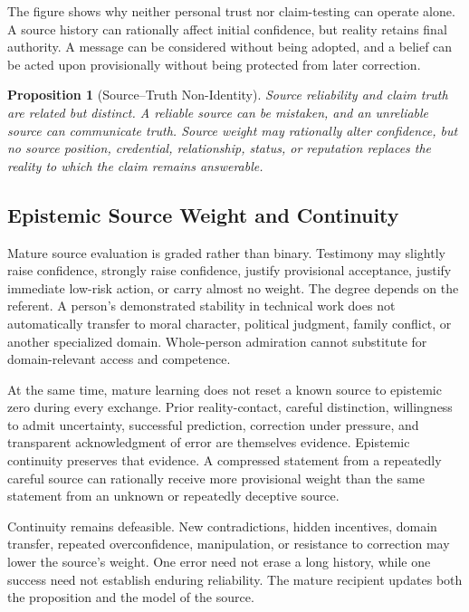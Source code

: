 \documentclass[11pt]{article}
\newtheorem{proposition}{Proposition}
\begin{document}
The figure shows why neither personal trust nor claim-testing can operate alone. A source history can rationally affect initial confidence, but reality retains final authority. A message can be considered without being adopted, and a belief can be acted upon provisionally without being protected from later correction.

\begin{proposition}[Source--Truth Non-Identity]
Source reliability and claim truth are related but distinct. A reliable source can be mistaken, and an unreliable source can communicate truth. Source weight may rationally alter confidence, but no source position, credential, relationship, status, or reputation replaces the reality to which the claim remains answerable.
\end{proposition}

\subsection{Epistemic Source Weight and Continuity}

Mature source evaluation is graded rather than binary. Testimony may slightly raise confidence, strongly raise confidence, justify provisional acceptance, justify immediate low-risk action, or carry almost no weight. The degree depends on the referent. A person's demonstrated stability in technical work does not automatically transfer to moral character, political judgment, family conflict, or another specialized domain. Whole-person admiration cannot substitute for domain-relevant access and competence.

At the same time, mature learning does not reset a known source to epistemic zero during every exchange. Prior reality-contact, careful distinction, willingness to admit uncertainty, successful prediction, correction under pressure, and transparent acknowledgment of error are themselves evidence. Epistemic continuity preserves that evidence. A compressed statement from a repeatedly careful source can rationally receive more provisional weight than the same statement from an unknown or repeatedly deceptive source.

Continuity remains defeasible. New contradictions, hidden incentives, domain transfer, repeated overconfidence, manipulation, or resistance to correction may lower the source's weight. One error need not erase a long history, while one success need not establish enduring reliability. The mature recipient updates both the proposition and the model of the source.
\end{document}
